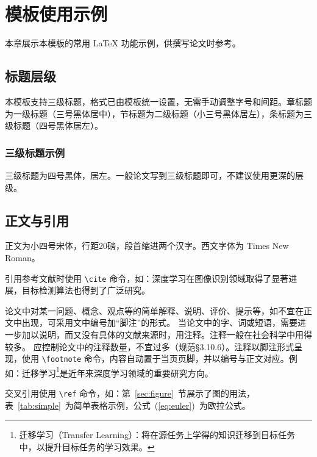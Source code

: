 \chapter{模板使用示例}
\label{cha:example}

本章展示本模板的常用 \LaTeX{} 功能示例，供撰写论文时参考。

\section{标题层级}
\label{sec:heading}

本模板支持三级标题，格式已由模板统一设置，无需手动调整字号和间距。章标题为一级标题（三号黑体居中），节标题为二级标题（小三号黑体居左），条标题为三级标题（四号黑体居左）。

\subsection{三级标题示例}
\label{subsec:heading3}

三级标题为四号黑体，居左。一般论文写到三级标题即可，不建议使用更深的层级。

\section{正文与引用}
\label{sec:text}

正文为小四号宋体，行距20磅，段首缩进两个汉字。西文字体为 Times New Roman。

引用参考文献时使用 \texttt{\textbackslash cite} 命令，如：深度学习在图像识别领域取得了显著进展\cite{ref1}，目标检测算法也得到了广泛研究\cite{ref2,ref3}。

论文中对某一问题、概念、观点等的简单解释、说明、评价、提示等，如不宜在正文中出现，可采用文中编号加“脚注”的形式。
当论文中的字、词或短语，需要进一步加以说明，而又没有具体的文献来源时，用注释。注释一般在社会科学中用得较多。
应控制论文中的注释数量，不宜过多（规范§3.10.6）。注释以脚注形式呈现，使用 \texttt{\textbackslash footnote} 命令，内容自动置于当页页脚，并以编号与正文对应。例如：迁移学习\footnote{迁移学习（Transfer Learning）：将在源任务上学得的知识迁移到目标任务中，以提升目标任务的学习效果。}是近年来深度学习领域的重要研究方向。

交叉引用使用 \texttt{\textbackslash ref} 命令，如：第~\ref{sec:figure}~节展示了图的用法，表~\ref{tab:simple}~为简单表格示例，公式~(\ref{eq:euler})~为欧拉公式。

